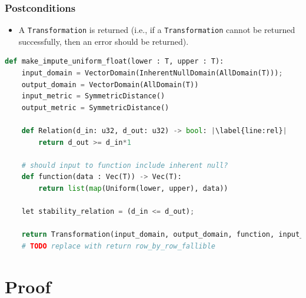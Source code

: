 \documentclass[11pt,a4paper]{article}
\begin{document}
\subsubsection*{Postconditions}
\begin{itemize}
    \item A \texttt{Transformation} is returned (i.e., if a \texttt{Transformation} cannot be returned successfully, then an error should be returned).
\end{itemize}


\begin{lstlisting}[language=Python, escapechar=|]
def make_impute_uniform_float(lower : T, upper : T):
    input_domain = VectorDomain(InherentNullDomain(AllDomain(T)));
    output_domain = VectorDomain(AllDomain(T))
    input_metric = SymmetricDistance()
    output_metric = SymmetricDistance()

    def Relation(d_in: u32, d_out: u32) -> bool: |\label{line:rel}|
        return d_out >= d_in*1
    
    # should input to function include inherent null?
    def function(data : Vec(T)) -> Vec(T): 
        return list(map(Uniform(lower, upper), data))

    let stability_relation = (d_in <= d_out);
    
    return Transformation(input_domain, output_domain, function, input_metric, output_metric, stability_relation)
    # TODO replace with return row_by_row_fallible

\end{lstlisting}




\section{Proof}
\end{document}
